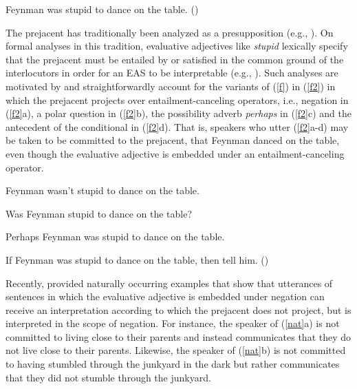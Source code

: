 \documentclass[11pt,fleqn]{article}
\newcommand{\6}{\mbox{$[\hspace*{-.6mm}[$}}
\newcommand{\9}{\mbox{$]\hspace*{-.6mm}]$}}
\begin{document}
\begin{exe} 
\ex\label{f} Feynman was stupid to dance on the table. \hfill (\citealt[18]{barker02})
\end{exe} 
The prejacent has traditionally been analyzed as a presupposition (e.g., \citealt{norrick78,barker02,oshima09b,kertz2010}). On formal analyses in this tradition, evaluative adjectives like {\em stupid} lexically specify that the prejacent
must be entailed by or satisfied in the common ground of the interlocutors in
order for an EAS to be interpretable (e.g.,
\citealt{heim83,vds92}). Such analyses are motivated by and straightforwardly account for the variants of (\ref{f}) in (\ref{f2}) in which the prejacent projects over entailment-canceling operators, i.e., negation in (\ref{f2}a), a polar question in (\ref{f2}b), the possibility adverb {\em perhaps} in (\ref{f2}c) and the antecedent of the conditional in (\ref{f2}d). That is, speakers who utter (\ref{f2}a-d) may be taken to be committed to the prejacent, that Feynman danced on the table, even though the evaluative adjective is embedded under an entailment-canceling operator. 

\begin{exe}

\ex\label{f2} 

\begin{xlist}

\ex Feynman wasn't stupid to dance on the table.

\ex Was Feynman stupid to dance on the table?

\ex Perhaps Feynman was stupid to dance on the table.

\ex If Feynman was stupid to dance on the table, then tell him. \hfill (\citealt[18f.]{barker02})

\end{xlist}
\end{exe}

Recently, \citet{karttunen-etal2014} provided naturally occurring examples that show that utterances of sentences in which the evaluative adjective is embedded under negation can receive an interpretation according to which the prejacent
does not project, but is interpreted in the scope of negation. For instance, the speaker of (\ref{nat}a) is not committed to living close to their parents and instead communicates that they do not live close to their parents. Likewise, the speaker of (\ref{nat}b) is not committed to having stumbled through the junkyard in the dark but rather communicates that they did not stumble through the junkyard. 
\end{document}
